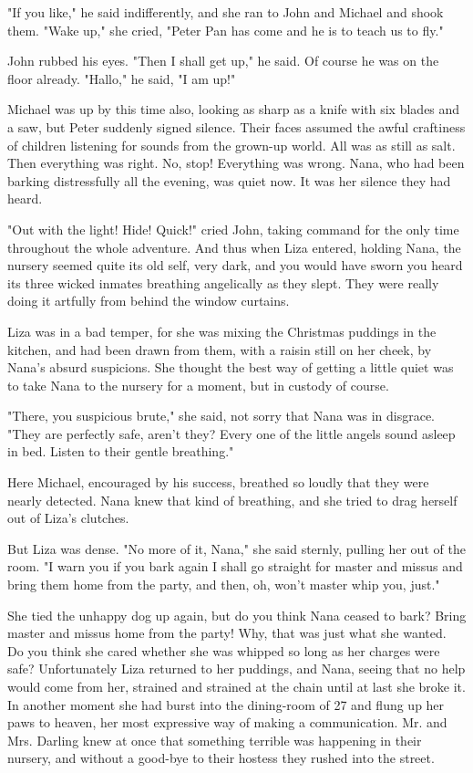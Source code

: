 "If you like," he said indifferently, and she ran to John and Michael and
shook them. "Wake up," she cried, "Peter Pan has come and he is to teach
us to fly."


John rubbed his eyes. "Then I shall get up," he said. Of course he was on
the floor already. "Hallo," he said, "I am up!"


Michael was up by this time also, looking as sharp as a knife with six
blades and a saw, but Peter suddenly signed silence. Their faces assumed
the awful craftiness of children listening for sounds from the grown-up
world. All was as still as salt. Then everything was right. No, stop!
Everything was wrong. Nana, who had been barking distressfully all the
evening, was quiet now. It was her silence they had heard.


"Out with the light! Hide! Quick!" cried John, taking command for the only
time throughout the whole adventure. And thus when Liza entered, holding
Nana, the nursery seemed quite its old self, very dark, and you would have
sworn you heard its three wicked inmates breathing angelically as they
slept. They were really doing it artfully from behind the window curtains.


Liza was in a bad temper, for she was mixing the Christmas puddings in the
kitchen, and had been drawn from them, with a raisin still on her cheek,
by Nana's absurd suspicions. She thought the best way of getting a little
quiet was to take Nana to the nursery for a moment, but in custody of
course.


"There, you suspicious brute," she said, not sorry that Nana was in
disgrace. "They are perfectly safe, aren't they? Every one of the little
angels sound asleep in bed. Listen to their gentle breathing."


Here Michael, encouraged by his success, breathed so loudly that they were
nearly detected. Nana knew that kind of breathing, and she tried to drag
herself out of Liza's clutches.


But Liza was dense. "No more of it, Nana," she said sternly, pulling her
out of the room. "I warn you if you bark again I shall go straight for
master and missus and bring them home from the party, and then, oh, won't
master whip you, just."


She tied the unhappy dog up again, but do you think Nana ceased to bark?
Bring master and missus home from the party! Why, that was just what she
wanted. Do you think she cared whether she was whipped so long as her
charges were safe? Unfortunately Liza returned to her puddings, and Nana,
seeing that no help would come from her, strained and strained at the
chain until at last she broke it. In another moment she had burst into the
dining-room of 27 and flung up her paws to heaven, her most expressive way
of making a communication. Mr. and Mrs. Darling knew at once that
something terrible was happening in their nursery, and without a good-bye
to their hostess they rushed into the street.


